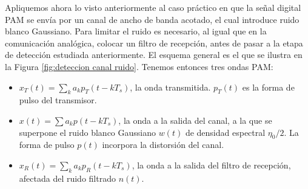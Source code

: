 Apliquemos ahora lo visto anteriormente al caso práctico en que la señal digital PAM se envía por un canal de ancho de banda acotado, el cual introduce ruido blanco Gaussiano. Para limitar el ruido es necesario, al igual que en la comunicación analógica, colocar un filtro de recepción, antes de pasar a la etapa de detección estudiada anteriormente. El esquema general es el que se ilustra en la Figura \ref{fig:deteccion canal ruido}. Tenemos entonces tres ondas PAM:
\begin{itemize}
\item $x_T(t)= \sum_k a_k p_T(t-kT_s)$, la onda transmitida. $p_T(t)$ es la forma de pulso del transmisor.
\item $x(t)=\sum a_k p(t-kT_s)$, la onda a la salida del canal, a la que se superpone el ruido blanco Gaussiano $w(t)$ de densidad espectral $\eta_0/2$. La forma de pulso $p(t)$ incorpora la distorsión del canal.
\item $x_R(t) = \sum_k a_k p_R(t-kT_s)$, la onda a la salida del filtro de recepción, afectada del ruido filtrado $n(t)$.
\end{itemize}

